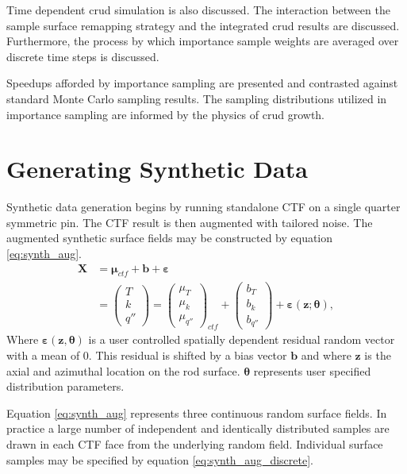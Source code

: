 Time dependent crud simulation is also discussed.  The interaction between the sample surface remapping strategy and the integrated crud results are discussed.  Furthermore, the process by which importance sample weights are averaged over discrete time steps is discussed.

Speedups afforded by importance sampling are presented and contrasted against standard Monte Carlo sampling results.  The sampling distributions utilized in importance sampling are informed by the physics of crud growth.

\section{Generating Synthetic Data}

Synthetic data generation begins by running standalone CTF on a single quarter symmetric pin.   The CTF result is then augmented with tailored noise.  The augmented synthetic surface fields may be constructed by equation \ref{eq:synth_aug}.
\begin{align}
    \bm X &= \bm \mu_{ctf} + \bm b + \bm \varepsilon \nonumber \\
          &=
    \begin{pmatrix}
        T \\
        k \\
        q''
    \end{pmatrix}
    =
    \begin{pmatrix}
        \mu_{T} \\
        \mu_k \\
        \mu_{q''}
    \end{pmatrix}_{ctf}
    + \begin{pmatrix}
        b_{T} \\
        b_k \\
        b_{q''}
    \end{pmatrix}
    + \bm{\varepsilon} (\mathbf z; \bm \theta),
\label{eq:synth_aug}
\end{align}
Where $\bm \varepsilon(\mathbf z, \bm \theta)$ is a user controlled spatially dependent residual random vector with a mean of 0.  This residual is
shifted by a bias vector
$\mathbf b$ and where $\mathbf z$ is the axial and azimuthal location on the rod surface.
$\bm \theta$ represents user specified distribution parameters.

Equation \ref{eq:synth_aug} represents three continuous random surface fields.  In practice a large number of independent and identically distributed samples are drawn in each CTF face from the underlying random field.  Individual surface samples may be specified by equation \ref{eq:synth_aug_discrete}.

